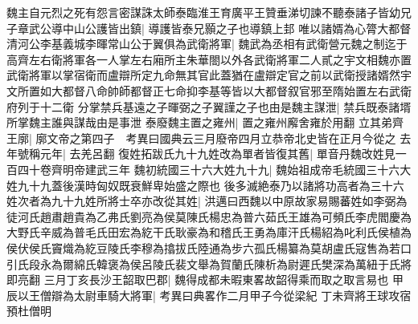 魏主自元烈之死有怨言密謀誅太師泰臨淮王育廣平王贊垂涕切諫不聽泰諸子皆幼兄子章武公導中山公護皆出鎮|{
	導護皆泰兄顥之子也導鎮上邽}
唯以諸婿為心膂大都督清河公李基義城李暉常山公于翼俱為武衛將軍|{
	魏武為丞相有武衛營元魏之制迄于高齊左右衛將軍各一人掌左右廂所主朱華閤以外各武衛將軍二人貳之宇文相魏亦置武衛將軍以掌宿衛而盧辯所定九命無其官此蓋猶在盧辯定官之前以武衛授諸婿然宇文所置如大都督八命帥師都督正七命抑李基等皆以大都督叙官邪至隋始置左右武衛府列于十二衛}
分掌禁兵基遠之子暉弼之子翼謹之子也由是魏主謀泄|{
	禁兵既泰諸壻所掌魏主誰與謀哉由是事泄}
泰廢魏主置之雍州|{
	置之雍州廨舍雍於用翻}
立其弟齊王廓|{
	廓文帝之第四子　考異曰國典云三月廢帝四月立恭帝北史皆在正月今從之}
去年號稱元年|{
	去羌呂翻}
復姓拓跋氏九十九姓改為單者皆復其舊|{
	單音丹魏改姓見一百四十卷齊明帝建武三年}
魏初統國三十六大姓九十九|{
	魏始祖成帝毛統國三十六大姓九十九蓋後漢時匈奴既衰鮮卑始盛之際也}
後多滅絶泰乃以諸將功高者為三十六姓次者為九十九姓所將士卒亦改從其姓|{
	洪邁曰西魏以中原故家易賜蕃姓如李弼為徒河氏趙肅趙貴為乙弗氏劉亮為侯莫陳氏楊忠為普六茹氏王雄為可頻氏李虎閻慶為大野氏辛威為普毛氏田宏為紇干氏耿豪為和稽氏王勇為庫汗氏楊紹為叱利氏侯植為侯伏侯氏竇熾為紇豆陵氏李穆為㩉拔氏陸通為步六孤氏楊纂為莫胡盧氏寇售為若口引氏段永為爾綿氏韓褒為侯呂陵氏裴文舉為賀蘭氏陳析為尉遲氏樊深為萬紐于氏將即亮翻}
三月丁亥長沙王韶取巴郡|{
	魏得成都未暇東畧故韶得乘而取之取言易也}
甲辰以王僧辯為太尉車騎大將軍|{
	考異曰典畧作二月甲子今從梁紀}
丁未齊將王球攻宿預杜僧明

